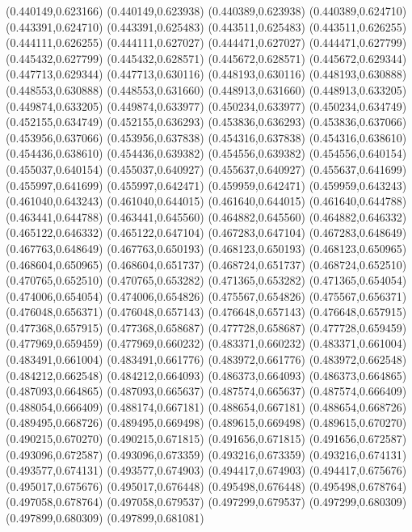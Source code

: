 (0.440149,0.623166)
(0.440149,0.623938)
(0.440389,0.623938)
(0.440389,0.624710)
(0.443391,0.624710)
(0.443391,0.625483)
(0.443511,0.625483)
(0.443511,0.626255)
(0.444111,0.626255)
(0.444111,0.627027)
(0.444471,0.627027)
(0.444471,0.627799)
(0.445432,0.627799)
(0.445432,0.628571)
(0.445672,0.628571)
(0.445672,0.629344)
(0.447713,0.629344)
(0.447713,0.630116)
(0.448193,0.630116)
(0.448193,0.630888)
(0.448553,0.630888)
(0.448553,0.631660)
(0.448913,0.631660)
(0.448913,0.633205)
(0.449874,0.633205)
(0.449874,0.633977)
(0.450234,0.633977)
(0.450234,0.634749)
(0.452155,0.634749)
(0.452155,0.636293)
(0.453836,0.636293)
(0.453836,0.637066)
(0.453956,0.637066)
(0.453956,0.637838)
(0.454316,0.637838)
(0.454316,0.638610)
(0.454436,0.638610)
(0.454436,0.639382)
(0.454556,0.639382)
(0.454556,0.640154)
(0.455037,0.640154)
(0.455037,0.640927)
(0.455637,0.640927)
(0.455637,0.641699)
(0.455997,0.641699)
(0.455997,0.642471)
(0.459959,0.642471)
(0.459959,0.643243)
(0.461040,0.643243)
(0.461040,0.644015)
(0.461640,0.644015)
(0.461640,0.644788)
(0.463441,0.644788)
(0.463441,0.645560)
(0.464882,0.645560)
(0.464882,0.646332)
(0.465122,0.646332)
(0.465122,0.647104)
(0.467283,0.647104)
(0.467283,0.648649)
(0.467763,0.648649)
(0.467763,0.650193)
(0.468123,0.650193)
(0.468123,0.650965)
(0.468604,0.650965)
(0.468604,0.651737)
(0.468724,0.651737)
(0.468724,0.652510)
(0.470765,0.652510)
(0.470765,0.653282)
(0.471365,0.653282)
(0.471365,0.654054)
(0.474006,0.654054)
(0.474006,0.654826)
(0.475567,0.654826)
(0.475567,0.656371)
(0.476048,0.656371)
(0.476048,0.657143)
(0.476648,0.657143)
(0.476648,0.657915)
(0.477368,0.657915)
(0.477368,0.658687)
(0.477728,0.658687)
(0.477728,0.659459)
(0.477969,0.659459)
(0.477969,0.660232)
(0.483371,0.660232)
(0.483371,0.661004)
(0.483491,0.661004)
(0.483491,0.661776)
(0.483972,0.661776)
(0.483972,0.662548)
(0.484212,0.662548)
(0.484212,0.664093)
(0.486373,0.664093)
(0.486373,0.664865)
(0.487093,0.664865)
(0.487093,0.665637)
(0.487574,0.665637)
(0.487574,0.666409)
(0.488054,0.666409)
(0.488174,0.667181)
(0.488654,0.667181)
(0.488654,0.668726)
(0.489495,0.668726)
(0.489495,0.669498)
(0.489615,0.669498)
(0.489615,0.670270)
(0.490215,0.670270)
(0.490215,0.671815)
(0.491656,0.671815)
(0.491656,0.672587)
(0.493096,0.672587)
(0.493096,0.673359)
(0.493216,0.673359)
(0.493216,0.674131)
(0.493577,0.674131)
(0.493577,0.674903)
(0.494417,0.674903)
(0.494417,0.675676)
(0.495017,0.675676)
(0.495017,0.676448)
(0.495498,0.676448)
(0.495498,0.678764)
(0.497058,0.678764)
(0.497058,0.679537)
(0.497299,0.679537)
(0.497299,0.680309)
(0.497899,0.680309)
(0.497899,0.681081)
